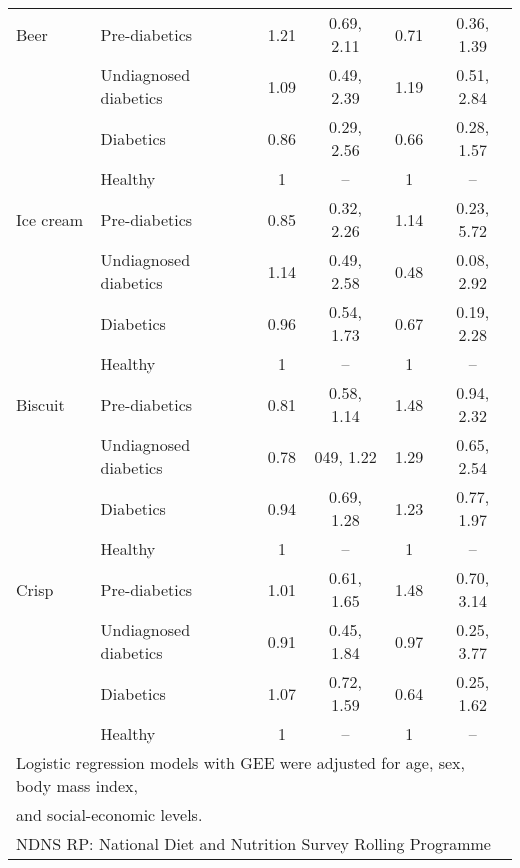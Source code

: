 \documentclass[utf8]{frontiers_suppmat} %
\begin{document}
\begin{table}[]
\begin{tabular}{llcccc}
Beer                & Pre-diabetics         & 1.21 & 0.69, 2.11 & 0.71 & 0.36, 1.39  \\
                    & Undiagnosed diabetics & 1.09 & 0.49, 2.39 & 1.19 & 0.51, 2.84  \\
                    & Diabetics             & 0.86 & 0.29, 2.56 & 0.66 & 0.28, 1.57  \\
                    & Healthy               & 1    & --         & 1    & --          \\
Ice cream           & Pre-diabetics         & 0.85 & 0.32, 2.26 & 1.14 & 0.23, 5.72  \\
                    & Undiagnosed diabetics & 1.14 & 0.49, 2.58 & 0.48 & 0.08, 2.92  \\
                    & Diabetics             & 0.96 & 0.54, 1.73 & 0.67 & 0.19, 2.28  \\
                    & Healthy               & 1    & --         & 1    & --          \\
Biscuit             & Pre-diabetics         & 0.81 & 0.58, 1.14 & 1.48 & 0.94, 2.32  \\
                    & Undiagnosed diabetics & 0.78 & 049, 1.22  & 1.29 & 0.65, 2.54  \\
                    & Diabetics             & 0.94 & 0.69, 1.28 & 1.23 & 0.77, 1.97  \\
                    & Healthy               & 1    & --         & 1    & --          \\
Crisp               & Pre-diabetics         & 1.01 & 0.61, 1.65 & 1.48 & 0.70, 3.14  \\
                    & Undiagnosed diabetics & 0.91 & 0.45, 1.84 & 0.97 & 0.25, 3.77  \\
                    & Diabetics             & 1.07 & 0.72, 1.59 & 0.64 & 0.25, 1.62  \\
                    & Healthy               & 1    & --         & 1    & --          \\\bottomrule
\multicolumn{6}{l}{Logistic regression models with GEE were adjusted for age, sex, body mass index,}\\
\multicolumn{6}{l}{and social-economic levels.}\\
\multicolumn{6}{l}{NDNS RP: National Diet and Nutrition Survey Rolling Programme}   
\end{tabular}
\end{table}
\end{document}
